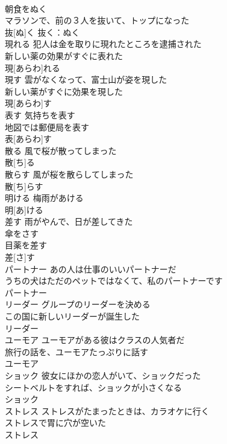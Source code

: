 \documentclass[8pt]{extreport}
\begin{document}
\begin{CJK}{UTF8}{min}
\\	朝食をぬく 
\\	マラソンで、前の３人を抜いて、トップになった 
\\	抜[ぬ]く			抜く：ぬく
\\	現れる	犯人は金を取りに現れたところを逮捕された 
\\	新しい薬の効果がすぐに表れた 
\\	現[あらわ]れる						
\\	現す	雲がなくなって、富士山が姿を現した 
\\	新しい薬がすぐに効果を現した 
\\	現[あらわ]す			
\\	表す	気持ちを表す 
\\	地図では郵便局を表す 
\\	表[あらわ]す		
\\	散る	風で桜が散ってしまった 
\\	散[ち]る						
\\	散らす	風が桜を散らしてしまった 
\\	散[ち]らす						
\\	明ける	梅雨があける 
\\	明[あ]ける						
\\	差す	雨がやんで、日が差してきた 
\\	傘をさす 
\\	目薬を差す 
\\	差[さ]す						
\\	パートナー	あの人は仕事のいいパートナーだ 
\\	うちの犬はただのペットではなくて、私のパートナーです 
\\	パートナー			
\\	リーダー	グループのリーダーを決める 
\\	この国に新しいリーダーが誕生した 
\\	リーダー			
\\	ユーモア	ユーモアがある彼はクラスの人気者だ 
\\	旅行の話を、ユーモアたっぷりに話す 
\\	ユーモア			
\\	ショック	彼女にほかの恋人がいて、ショックだった 
\\	シートベルトをすれば、ショックが小さくなる 
\\	ショック						
\\	ストレス	ストレスがたまったときは、カラオケに行く 
\\	ストレスで胃に穴が空いた 
\\	ストレス						

\end{CJK}
\end{document}
